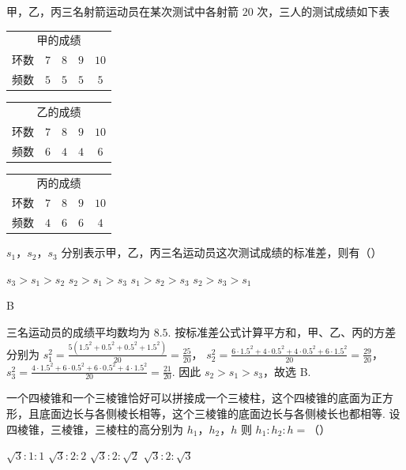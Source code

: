 \begin{problem}
甲，乙，丙三名射箭运动员在某次测试中各射箭 \(20\) 次，三人的测试成绩如下表

\begin{center}
\begin{tabular}{ccccc}
\multicolumn{5}{c}{甲的成绩} \\
环数 & \(7\) & \(8\) & \(9\) & \(10\) \\
频数 & \(5\) & \(5\) & \(5\) & \(5\)
\end{tabular}
\qquad
\begin{tabular}{ccccc}
\multicolumn{5}{c}{乙的成绩} \\
环数 & \(7\) & \(8\) & \(9\) & \(10\) \\
频数 & \(6\) & \(4\) & \(4\) & \(6\)
\end{tabular}
\qquad
\begin{tabular}{ccccc}
\multicolumn{5}{c}{丙的成绩} \\
环数 & \(7\) & \(8\) & \(9\) & \(10\) \\
频数 & \(4\) & \(6\) & \(6\) & \(4\)
\end{tabular}
\end{center}

\(s_{1}\)，\(s_{2}\)，\(s_{3}\) 分别表示甲，乙，丙三名运动员这次测试成绩的标准差，则有（\quad）

\choices
    {\(s_3 > s_1 > s_2\)}
    {\(s_2 > s_1 > s_3\)}
    {\(s_1 > s_2 > s_3\)}
    {\(s_2 > s_3 > s_1\)}
\end{problem}

\begin{answer}
B
\end{answer}

\begin{solution}
三名运动员的成绩平均数均为 \(8.5\). 按标准差公式计算平方和，甲、乙、丙的方差分别为
\(s_1^2=\frac{5(1.5^2+0.5^2+0.5^2+1.5^2)}{20}=\frac{25}{20}\)，
\(s_2^2=\frac{6\cdot1.5^2+4\cdot0.5^2+4\cdot0.5^2+6\cdot1.5^2}{20}=\frac{29}{20}\)，
\(s_3^2=\frac{4\cdot1.5^2+6\cdot0.5^2+6\cdot0.5^2+4\cdot1.5^2}{20}=\frac{21}{20}\). 因此 \(s_2>s_1>s_3\)，故选 B.
\end{solution}

\begin{problem}
一个四棱锥和一个三棱锥恰好可以拼接成一个三棱柱，这个四棱锥的底面为正方形，且底面边长与各侧棱长相等，这个三棱锥的底面边长与各侧棱长也都相等. 设四棱锥，三棱锥，三棱柱的高分别为 \(h_1\)，\(h_2\)，\(h\) 则 \(h_1: h_2: h =\)（\quad）

\choices
    {\(\sqrt{3}: 1: 1\)}
    {\(\sqrt{3}: 2: 2\)}
    {\(\sqrt{3}: 2: \sqrt{2}\)}
    {\(\sqrt{3}: 2: \sqrt{3}\)}
\end{problem}

